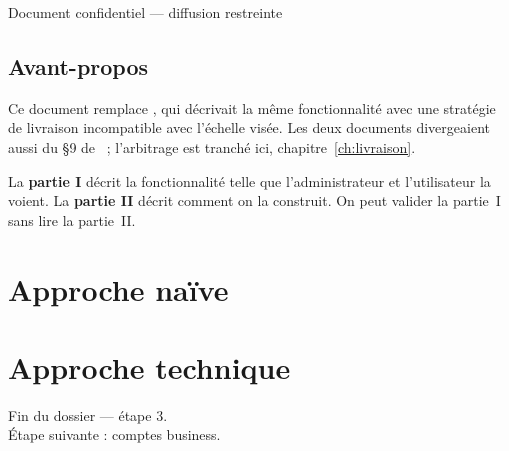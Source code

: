 \documentclass[11pt,a4paper,oneside]{report}
\begin{document}
\begin{titlepage}
\vspace{0.8cm}
\begin{center}\color{AlanyaGray}\small\sffamily
  Document confidentiel --- diffusion restreinte
\end{center}
\end{titlepage}

\chapter*{Avant-propos}
\thispagestyle{plain}

Ce document remplace , qui décrivait la même
fonctionnalité avec une stratégie de livraison incompatible avec l'échelle visée. Les deux
documents divergeaient aussi du §9 de ~; l'arbitrage est
tranché ici, chapitre~\ref{ch:livraison}.

\begin{note}
La \textbf{partie I} décrit la fonctionnalité telle que l'administrateur et l'utilisateur la
voient. La \textbf{partie II} décrit comment on la construit. On peut valider la partie~I
sans lire la partie~II.
\end{note}

\tableofcontents

\part{Approche naïve}



\part{Approche technique}



\vfill
\begin{center}\small\color{AlanyaGray}\sffamily
Fin du dossier --- étape 3. \\
Étape suivante : comptes business.
\end{center}
\end{document}
